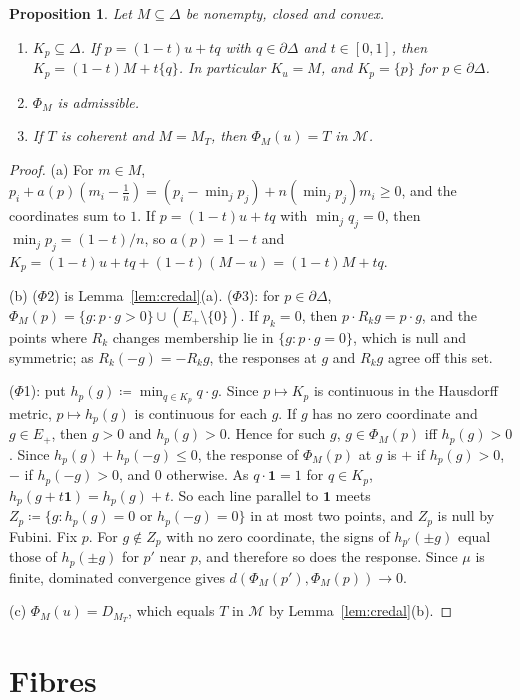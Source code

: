 \documentclass[11pt]{article}
\newcommand{\chg}[1]{{\color{red}#1}}
\newtheorem{proposition}[theorem]{Proposition}
\theoremstyle{definition}
\theoremstyle{remark}
\newcommand{\M}{\mathcal M}
\newcommand{\one}{\mathbf 1}
\newcommand{\bd}{\partial}
\begin{document}
\begin{proposition}\label{prop:radial}
Let $M\subseteq\Delta$ be nonempty, closed and convex.
\begin{enumerate}[label=\textup{(\alph*)}]
\item $K_p\subseteq\Delta$. If $p=(1-t)u+tq$ with $q\in\bd\Delta$ and $t\in[0,1]$, then $K_p=(1-t)M+t\{q\}$. In particular $K_u=M$, and $K_p=\{p\}$ for $p\in\bd\Delta$.
\item $\Phi_M$ is admissible.
\item If $T$ is coherent and $M=M_T$, then $\Phi_M(u)=T$ in $\M$.
\end{enumerate}
\end{proposition}
\begin{proof}
(a) For $m\in M$, $p_i+a(p)(m_i-\tfrac1n)=(p_i-\min_jp_j)+n(\min_jp_j)m_i\ge0$, and the coordinates sum to $1$. If $p=(1-t)u+tq$ with $\min_jq_j=0$, then $\min_jp_j=(1-t)/n$, so $a(p)=1-t$ and $K_p=(1-t)u+tq+(1-t)(M-u)=(1-t)M+tq$.

(b) ($\Phi$2) is Lemma~\ref{lem:credal}(a). ($\Phi$3): for $p\in\bd\Delta$, $\Phi_M(p)=\{g:p\cdot g>0\}\cup(E_+\setminus\{0\})$. If $p_k=0$, then $p\cdot R_kg=p\cdot g$, and the points where $R_k$ changes membership lie in $\{g:p\cdot g=0\}$, which is null\chg{ and symmetric; as $R_k(-g)=-R_kg$, the responses at $g$ and $R_kg$ agree off this set}.

($\Phi$1): put $h_p(g)\coloneqq\min_{q\in K_p}q\cdot g$. Since $p\mapsto K_p$ is continuous in the Hausdorff metric, $p\mapsto h_p(g)$ is continuous for each $g$. If $g$ has no zero coordinate and $g\in E_+$, then $g>0$ and $h_p(g)>0$. Hence for such $g$, $g\in\Phi_M(p)$ iff $h_p(g)>0$. Since $h_p(g)+h_p(-g)\le0$, the response of $\Phi_M(p)$ at $g$ is $+$ if $h_p(g)>0$, $-$ if $h_p(-g)>0$, and $0$ otherwise. As $q\cdot\one=1$ for $q\in K_p$, $h_p(g+t\one)=h_p(g)+t$. So each line parallel to $\one$ meets $Z_p\coloneqq\{g:h_p(g)=0\text{ or }h_p(-g)=0\}$ in at most two points, and $Z_p$ is null by Fubini. Fix $p$. For $g\notin Z_p$ with no zero coordinate, the signs of $h_{p'}(\pm g)$ equal those of $h_p(\pm g)$ for $p'$ near $p$, and therefore so does the response. Since $\mu$ is finite, dominated convergence gives $d(\Phi_M(p'),\Phi_M(p))\to0$.

(c) $\Phi_M(u)=D_{M_T}$, which equals $T$ in $\M$ by Lemma~\ref{lem:credal}(b).
\end{proof}

\section{Fibres}\label{sec:fibres}
\end{document}
